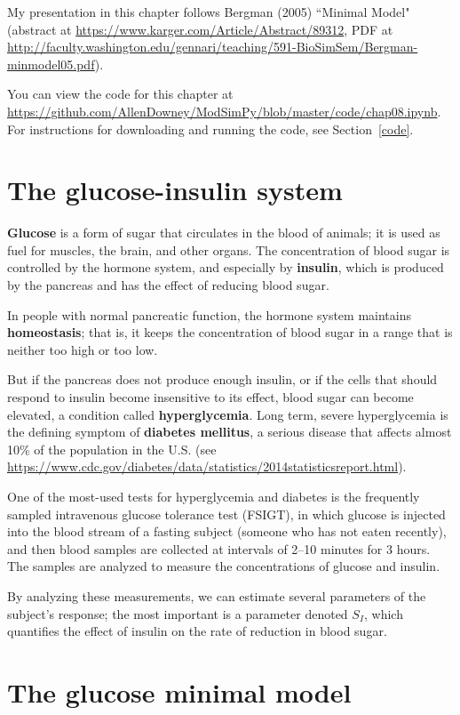 \documentclass[12pt]{book}
\theoremstyle{exercise}
\begin{document}
My presentation in this chapter follows Bergman (2005) ``Minimal Model" (abstract at \url{https://www.karger.com/Article/Abstract/89312}, PDF at \url{http://faculty.washington.edu/gennari/teaching/591-BioSimSem/Bergman-minmodel05.pdf}).

You can view the code for this chapter at \url{https://github.com/AllenDowney/ModSimPy/blob/master/code/chap08.ipynb}.  For instructions for downloading and running the code, see Section~\ref{code}.


\section{The glucose-insulin system}

{\bf Glucose} is a form of sugar that circulates in the blood of animals; it is used as fuel for muscles, the brain, and other organs.  The concentration of blood sugar is controlled by the hormone system, and especially by {\bf insulin}, which is produced by the pancreas and has the effect of reducing blood sugar.

In people with normal pancreatic function, the hormone system maintains {\bf homeostasis}; that is, it keeps the concentration of blood sugar in a range that is neither too high or too low.

But if the pancreas does not produce enough insulin, or if the cells that should respond to insulin become insensitive to its effect, blood sugar can become elevated, a condition called {\bf hyperglycemia}.  Long term, severe hyperglycemia is the defining symptom of {\bf diabetes mellitus}, a serious disease that affects almost 10\% of the population in the U.S. (see \url{https://www.cdc.gov/diabetes/data/statistics/2014statisticsreport.html}).

One of the most-used tests for hyperglycemia and diabetes is the frequently sampled intravenous glucose tolerance test (FSIGT), in which glucose is injected into the blood stream of a fasting subject (someone who has not eaten recently), and then blood samples are collected at intervals of 2--10 minutes for 3 hours.  The samples are analyzed to measure the concentrations of glucose and insulin.

By analyzing these measurements, we can estimate several parameters of the subject's response; the most important is a parameter denoted $S_I$, which quantifies the effect of insulin on the rate of reduction in blood sugar.


\section{The glucose minimal model}
\end{document}

